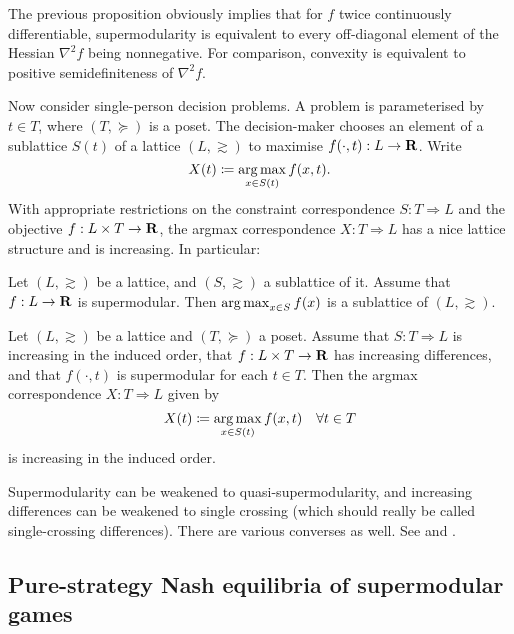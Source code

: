 \documentclass[11pt,letterpaper,reqno,oneside]{article}
\begin{document}
The previous proposition obviously implies that for $f$ twice continuously differentiable, supermodularity is equivalent to every off-diagonal element of the Hessian $\nabla^2 f$ being nonnegative. For comparison, convexity is equivalent to positive semidefiniteness of $\nabla^2 f$.


Now consider single-person decision problems. A problem is parameterised by $t \in T$, where $(T,\succeq)$ is a poset. The decision-maker chooses an element of a sublattice $S(t)$ of a lattice $(L,\gtrsim)$ to maximise $f(\cdot,t) : L \to \mathbf{R}$. Write
%
\begin{equation*}
	X(t) \coloneqq \operatorname*{arg\,max}_{x \in S(t)} f(x,t) .
\end{equation*}
%
With appropriate restrictions on the constraint correspondence $S : T \Rightarrow L$ and the objective $f : L \times T \to \mathbf{R}$, the argmax correspondence $X : T \Rightarrow L$ has a nice lattice structure and is increasing. In particular:

\begin{lemma}
	Let $(L,\gtrsim)$ be a lattice, and $(S,\gtrsim)$ a sublattice of it. Assume that $f : L \to \mathbf{R}$ is supermodular. Then $\operatorname*{arg\,max}_{x \in S} f(x)$ is a sublattice of $(L,\gtrsim)$.	
\end{lemma}

\begin{theorem}
	\label{theorem:Topkis}
	Let $(L,\gtrsim)$ be a lattice and $(T,\succeq)$ a poset. Assume that $S : T \Rightarrow L$ is increasing in the induced order, that $f : L \times T \to \mathbf{R}$ has increasing differences, and that $f(\cdot,t)$ is supermodular for each $t \in T$. Then the argmax correspondence $X : T \Rightarrow L$ given by
	\begin{equation*}
		X(t) \coloneqq \operatorname*{arg\,max}_{x \in S(t)} f(x,t) 
		\quad\forall t \in T
	\end{equation*}	
	is increasing in the induced order.
\end{theorem}


Supermodularity can be weakened to quasi-supermodularity, and increasing differences can be weakened to single crossing (which should really be called single-crossing differences). There are various converses as well. See \textcite{Topkis1998} and \textcite{MilgromShannon1994}.



\subsection{Pure-strategy Nash equilibria of supermodular games}
\label{sec:supermodular:supermodular_games}
\end{document}
